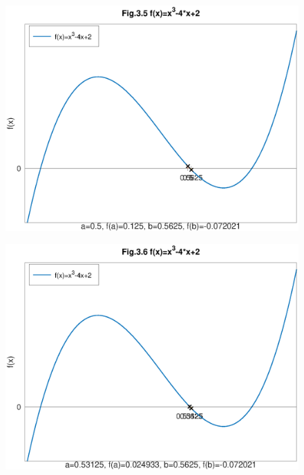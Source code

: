 \documentclass[12pt]{article}
\begin{document}
\begin{figure}[htbp]
    \begin{center}
        \includegraphics[height=90mm]{octave-fig/Fig.3.5.eps}
        \includegraphics[height=90mm]{octave-fig/Fig.3.6.eps}
    \end{center}
\end{figure}
\end{document}
